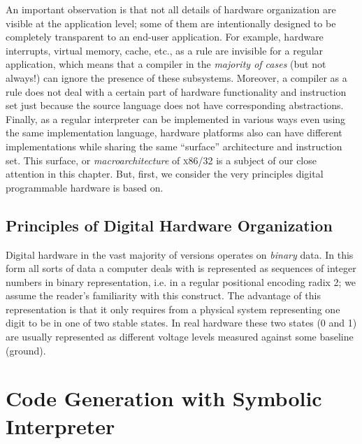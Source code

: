 An important observation is that not all details of hardware organization are visible at the application level; some of them are intentionally
designed to be completely transparent to an end-user application. For example, hardware interrupts, virtual memory, cache, etc., as a rule are
invisible for a regular application, which means that a compiler in the \emph{majority of cases} (but not always!) can ignore the presence of
these subsystems. Moreover, a compiler as a rule does not deal with a certain part of hardware functionality and instruction set just
because the source language does not have corresponding abstractions. Finally, as a regular interpreter can be implemented in
various ways even using the same implementation language, hardware platforms also can have different implementations while sharing
the same ``surface'' architecture and instruction set. This surface, or \emph{macroarchitecture} of \textsc{x86/32} is a subject
of our close attention in this chapter. But, first, we consider the very principles digital programmable hardware is based on.

\subsection{Principles of Digital Hardware Organization}

Digital hardware in the vast majority of versions operates on \emph{binary} data. In this form all sorts of data a computer
deals with is represented as sequences of integer numbers in binary representation, i.e. in a regular positional
encoding radix 2; we assume the reader's familiarity with this construct. The advantage of this representation
is that it only requires from a physical system representing one digit to be in one of two stable states. In real
hardware these two states (0 and 1) are usually represented as different voltage levels measured against some
baseline (ground).





\section{Code Generation with Symbolic Interpreter}

\section{}



